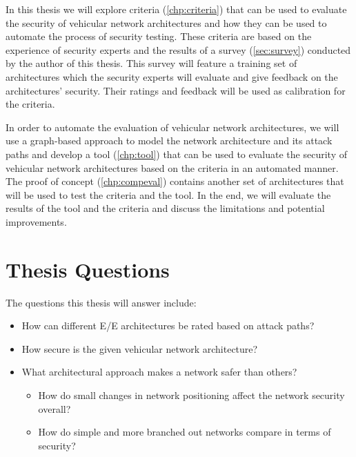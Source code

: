 In this thesis we will explore criteria (\ref{chp:criteria}) that can be used to evaluate the security of 
vehicular network architectures and how they can be used to automate the process of security testing.
These criteria are based on the experience of security experts and the results of a survey (\ref{sec:survey}) conducted by the author of this thesis.
This survey will feature a training set of architectures which the security experts will evaluate and give feedback on the architectures' security.
Their ratings and feedback will be used as calibration for the criteria.\par
In order to automate the evaluation of vehicular network architectures, we will use a graph-based approach to model the network architecture and its attack paths
and develop a tool (\ref{chp:tool}) that can be used to evaluate the security of vehicular network architectures based on the criteria in an automated manner.
The proof of concept (\ref{chp:compeval}) contains another set of architectures that will be used to test the criteria and the tool.
In the end, we will evaluate the results of the tool and the criteria and discuss the limitations and potential improvements.
\\

\section{Thesis Questions}
\label{sec:thesis-questions}

The questions this thesis will answer include:

\begin{itemize}
    \item How can different E/E architectures be rated based on attack paths?
    \item How secure is the given vehicular network architecture?
    \item What architectural approach makes a network safer than others?
    \begin{itemize}
        \item How do small changes in network positioning affect the network security overall?
        \item How do simple and more branched out networks compare in terms of security?
    \end{itemize}
\end{itemize}